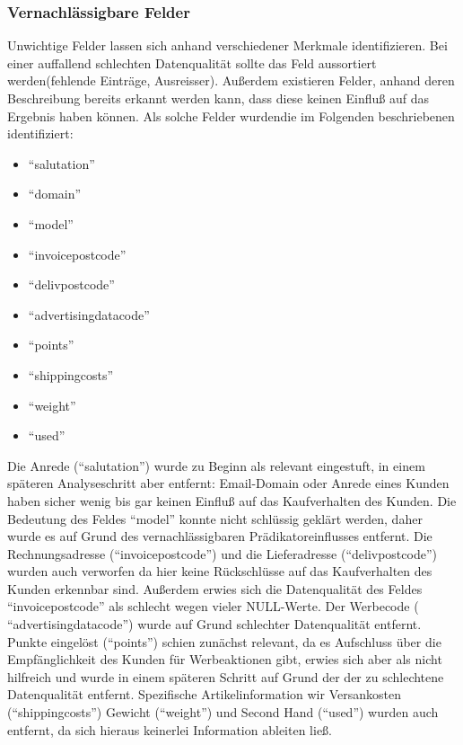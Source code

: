 \documentclass[a4paper,12pt]{article}
\begin{document}
\subsubsection{Vernachlässigbare Felder}
Unwichtige Felder lassen sich anhand verschiedener Merkmale identifizieren. Bei einer
auffallend schlechten Datenqualität sollte das Feld aussortiert werden(fehlende Einträge, Ausreisser).
Außerdem existieren Felder, anhand deren Beschreibung bereits erkannt werden
kann, dass diese keinen Einfluß auf das Ergebnis haben können. Als solche Felder wurdendie im Folgenden beschriebenen identifiziert:
\par
\vspace{1cm}
\begin{minipage}[h]{.5\textwidth}
\begin{itemize}
	\item "`salutation"'
	\item "`domain"'
	\item "`model"'
	\item "`invoicepostcode"'
	\item "`delivpostcode"'
\end{itemize}
\end{minipage}
\hfill
\begin{minipage}[h]{.5\textwidth}
\begin{itemize}
  \item "`advertisingdatacode"'
	\item "`points"'
	\item "`shippingcosts"'
	\item "`weight"'
	\item "`used"'
	\end{itemize}
\end{minipage}
\par
\vspace{1cm}
Die Anrede ("`salutation"') wurde zu Beginn als relevant eingestuft, in einem späteren Analyseschritt aber entfernt:
Email-Domain oder Anrede  eines Kunden haben sicher wenig bis gar keinen Einfluß auf das Kaufverhalten des Kunden. Die Bedeutung des Feldes "`model"' konnte nicht schlüssig geklärt werden, daher wurde es auf Grund des vernachlässigbaren Prädikatoreinflusses entfernt.
Die Rechnungsadresse ("`invoicepostcode"') und die Lieferadresse ("`delivpostcode"') wurden auch verworfen da hier keine Rückschlüsse auf das Kaufverhalten des Kunden erkennbar sind. Außerdem erwies sich die Datenqualität des Feldes "`invoicepostcode"' als schlecht wegen vieler NULL-Werte.
Der Werbecode ( "`advertisingdatacode"') wurde auf Grund schlechter Datenqualität entfernt. Punkte eingelöst ("`points"') schien zunächst relevant, da es Aufschluss über die Empfänglichkeit des Kunden für Werbeaktionen gibt, erwies sich aber als nicht hilfreich und wurde in einem späteren Schritt auf Grund der der zu schlechtene Datenqualität entfernt. Spezifische Artikelinformation wir Versankosten ("`shippingcosts"') Gewicht ("`weight"') und Second Hand ("`used"') wurden auch entfernt, da sich hieraus keinerlei Information ableiten ließ.
\end{document}
